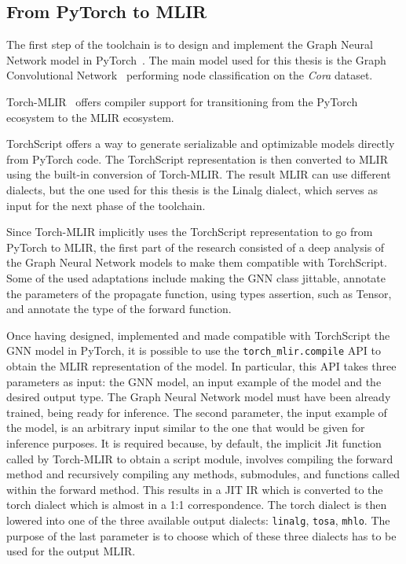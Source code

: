 \documentclass[11pt,a4paper,twocolumn]{article}
\begin{document}
\subsection{From PyTorch to MLIR}
\label{subsec:pytorch-toolchain}%

The first step of the toolchain is to design and implement the Graph Neural Network model in PyTorch~\cite{DBLP:journals/corr/abs-1912-01703}.
The main model used for this thesis is the Graph Convolutional Network~\cite{DBLP:journals/corr/KipfW16} performing node classification on the \textit{Cora} dataset.

Torch-MLIR~\cite{torch_mlir} offers compiler support for transitioning from the PyTorch ecosystem to the MLIR ecosystem.

TorchScript offers a way to generate serializable and optimizable models directly from PyTorch code.
The TorchScript representation is then converted to MLIR using the built-in conversion of Torch-MLIR\@.
The result MLIR can use different dialects, but the one used for this thesis is the Linalg dialect, which serves as input for the next phase of the toolchain.

Since Torch-MLIR implicitly uses the TorchScript representation to go from PyTorch to MLIR, the first part of the research consisted of a deep analysis of the Graph Neural Network models to make them compatible with TorchScript.
Some of the used adaptations include making the GNN class jittable, annotate the parameters of the propagate function, using types assertion, such as Tensor, and annotate the type of the forward function.

Once having designed, implemented and made compatible with TorchScript the GNN model in PyTorch, it is possible to use the \texttt{torch\_mlir.compile} API to obtain the MLIR representation of the model.
In particular, this API takes three parameters as input: the GNN model, an input example of the model and the desired output type.
The Graph Neural Network model must have been already trained, being ready for inference.
The second parameter, the input example of the model, is an arbitrary input similar to the one that would be given for inference purposes.
It is required because, by default, the implicit Jit function called by Torch-MLIR to obtain a script module, involves compiling the forward method and recursively compiling any methods, submodules, and functions called within the forward method.
This results in a JIT IR which is converted to the torch dialect which is almost in a 1:1 correspondence.
The torch dialect is then lowered into one of the three available output dialects: \texttt{linalg}, \texttt{tosa}, \texttt{mhlo}.
The purpose of the last parameter is to choose which of these three dialects has to be used for the output MLIR\@.
\end{document}
